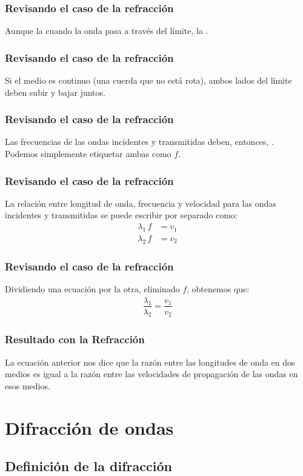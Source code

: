 \documentclass[14pt]{beamer}
\begin{document}
\begin{frame}
\frametitle{Revisando el caso de la refracción}
Aunque la  cuando la onda pasa a través del límite, \pause la .
\end{frame}
\begin{frame}
\frametitle{Revisando el caso de la refracción}
Si el medio es continuo (una cuerda que no está rota), ambos lados del límite deben subir y bajar juntos.
\end{frame}
\begin{frame}
\frametitle{Revisando el caso de la refracción}
Las frecuencias de las ondas incidentes y transmitidas deben, entonces, .
\\
\bigskip
\pause
Podemos simplemente etiquetar ambas como $f$.
\end{frame}
\begin{frame}
\frametitle{Revisando el caso de la refracción}
La relación entre longitud de onda, frecuencia y velocidad para las ondas incidentes y transmitidas se puede escribir por separado como:
\pause
\begin{align*}
\lambda_{1} \, f &= v_{1} \\[0.5em]
\lambda_{2} \, f &= v_{2}
\end{align*}
\end{frame}
\begin{frame}
\frametitle{Revisando el caso de la refracción}    
Dividiendo una ecuación por la otra, eliminado $f$, obtenemos que:
\pause
\begin{align*}
\dfrac{\lambda_1}{\lambda_{2}} = \dfrac{v_{1}}{v_{2}}
\end{align*}
\end{frame}
\begin{frame}
\frametitle{Resultado con la Refracción}
La ecuación anterior nos dice que la razón entre las longitudes de onda en dos medios es igual a la razón entre las velocidades de propagación de las ondas en esos medios.
\end{frame}

\section{Difracción de ondas}
\subsection{Definición de la difracción}
\end{document}
